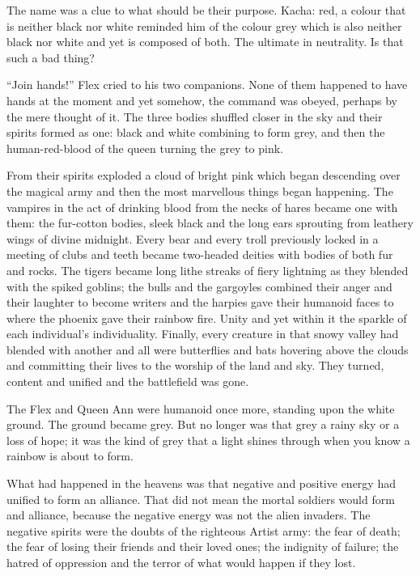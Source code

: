 The name was a clue to what should be their purpose. Kacha: red, a
colour that is neither black nor white reminded him of the colour grey
which is also neither black nor white and yet is composed of both. The
ultimate in neutrality. Is that such a bad thing?

“Join hands!” Flex cried to his two companions. None of them happened
to have hands at the moment and yet somehow, the command was obeyed,
perhaps by the mere thought of it. The three bodies shuffled closer in
the sky and their spirits formed as one: black and white combining to
form grey, and then the human-red-blood of the queen turning the grey
to pink.

From their spirits exploded a cloud of bright pink which began
descending over the magical army and then the most marvellous things
began happening. The vampires in the act of drinking blood from the
necks of hares became one with them: the fur-cotton bodies, sleek
black and the long ears sprouting from leathery wings of divine
midnight. Every bear and every troll previously locked in a meeting of
clubs and teeth became two-headed deities with bodies of both fur and
rocks. The tigers became long lithe streaks of fiery lightning as they
blended with the spiked goblins; the bulls and the gargoyles combined
their anger and their laughter to become writers and the harpies gave
their humanoid faces to where the phoenix gave their rainbow
fire. Unity and yet within it the sparkle of each individual’s
individuality. Finally, every creature in that snowy valley had
blended with another and all were butterflies and bats hovering above
the clouds and committing their lives to the worship of the land and
sky. They turned, content and unified and the battlefield was gone.

The Flex and Queen Ann were humanoid once more, standing upon the
white ground. The ground became grey. But no longer was that grey a
rainy sky or a loss of hope; it was the kind of grey that a light
shines through when you know a rainbow is about to form.

What had happened in the heavens was that negative and positive energy
had unified to form an alliance. That did not mean the mortal soldiers
would form and alliance, because the negative energy was not the alien
invaders. The negative spirits were the doubts of the righteous Artist
army: the fear of death; the fear of losing their friends and their
loved ones; the indignity of failure; the hatred of oppression and the
terror of what would happen if they lost.

